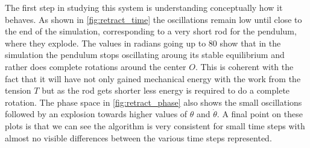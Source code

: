The first step in studying this system is understanding conceptually how it behaves. As shown in \autoref{fig:retract_time} the oscillations remain low until close to the end of the simulation, corresponding to a very short rod for the pendulum, where they explode. The values in radians going up to 80 show that in the simulation the pendulum stops oscillating aroung its stable equilibrium and rather does complete rotations around the center $O$. This is coherent with the fact that it will have not only gained mechanical energy with the work from the tension $T$ but as the rod gets shorter less energy is required to do a complete rotation. The phase space in \autoref{fig:retract_phase} also shows the small oscillations followed by an explosion towards higher values of $\theta$ and $\dot\theta$. A final point on these plots is that we can see the algorithm is very consistent for small time steps with almost no visible differences between the various time steps represented.

